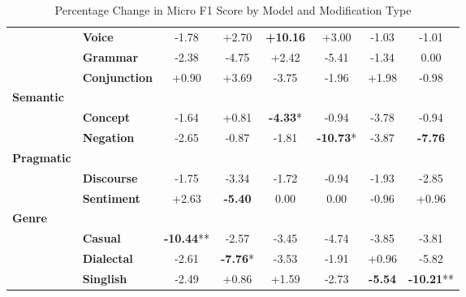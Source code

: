 \begin{table}[h]
\begin{adjustbox}{max width=\linewidth}
\begin{tabular}{llcccccc}
& \textbf{Voice} & \cellcolor{red!5} -1.78 & \cellcolor{green!8} +2.70 & \cellcolor{green!30} \textbf{+10.16} & \cellcolor{green!9} +3.00 & \cellcolor{red!3} -1.03 & \cellcolor{red!3} -1.01 \\
& \textbf{Grammar} & \cellcolor{red!7} -2.38 & \cellcolor{red!14} -4.75 & \cellcolor{green!7} +2.42 & \cellcolor{red!16} -5.41 & \cellcolor{red!4} -1.34 & \cellcolor{red!0} 0.00 \\
& \textbf{Conjunction} & \cellcolor{green!2} +0.90 & \cellcolor{green!11} +3.69 & \cellcolor{red!11} -3.75 & \cellcolor{red!5} -1.96 & \cellcolor{green!5} +1.98 & \cellcolor{red!2} -0.98 \\
\textbf{Semantic} & & & & & & & \\
& \textbf{Concept} & \cellcolor{red!4} -1.64 & \cellcolor{green!2} +0.81 & \cellcolor{red!12} \textbf{-4.33}* & \cellcolor{red!2} -0.94 & \cellcolor{red!11} -3.78 & \cellcolor{red!2} -0.94 \\
& \textbf{Negation} & \cellcolor{red!7} -2.65 & \cellcolor{red!2} -0.87 & \cellcolor{red!5} -1.81 & \cellcolor{red!30} \textbf{-10.73}* & \cellcolor{red!11} -3.87 & \cellcolor{red!23} \textbf{-7.76} \\
\textbf{Pragmatic} & & & & & & & \\
& \textbf{Discourse} & \cellcolor{red!5} -1.75 & \cellcolor{red!10} -3.34 & \cellcolor{red!5} -1.72 & \cellcolor{red!2} -0.94 & \cellcolor{red!5} -1.93 & \cellcolor{red!8} -2.85 \\
& \textbf{Sentiment} & \cellcolor{green!7} +2.63 & \cellcolor{red!16} \textbf{-5.40} & \cellcolor{red!0} 0.00 & \cellcolor{red!0} 0.00 & \cellcolor{red!2} -0.96 & \cellcolor{green!2} +0.96 \\
\textbf{Genre} & & & & & & & \\
& \textbf{Casual} & \cellcolor{red!30} \textbf{-10.44}** & \cellcolor{red!7} -2.57 & \cellcolor{red!10} -3.45 & \cellcolor{red!14} -4.74 & \cellcolor{red!11} -3.85 & \cellcolor{red!11} -3.81 \\
& \textbf{Dialectal} & \cellcolor{red!7} -2.61 & \cellcolor{red!23} \textbf{-7.76}* & \cellcolor{red!10} -3.53 & \cellcolor{red!5} -1.91 & \cellcolor{green!2} +0.96 & \cellcolor{red!17} -5.82 \\
& \textbf{Singlish} & \cellcolor{red!7} -2.49 & \cellcolor{green!2} +0.86 & \cellcolor{green!4} +1.59 & \cellcolor{red!8} -2.73 & \cellcolor{red!16} \textbf{-5.54} & \cellcolor{red!30} \textbf{-10.21}** \\
\end{tabular}
\end{adjustbox}
\caption{Percentage Change in Micro F1 Score by Model and Modification Type}
\label{tab:dialogue_results_table}
\end{table}